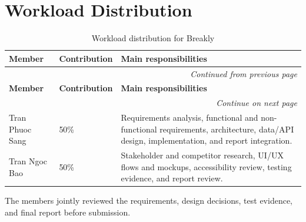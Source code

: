 \chapter*{Workload Distribution}

\begin{longtable}{|p{}|p{}|p{}|}
\caption{Workload distribution for Breakly}\label{tab:workload}\\
\hline
\textbf{Member} & \textbf{Contribution} & \textbf{Main responsibilities} \\
\hline
\endfirsthead
\multicolumn{3}{r}{\textit{Continued from previous page}}\\[-2pt]\hline
\textbf{Member} & \textbf{Contribution} & \textbf{Main responsibilities} \\
\hline
\endhead
\multicolumn{3}{r}{\textit{Continue on next page}}\\
\endfoot
\endlastfoot
Tran Phuoc Sang & 50\% &
Requirements analysis, functional and non-functional requirements,
architecture, data/API design, implementation, and report integration. \\
\hline
Tran Ngoc Bao & 50\% &
Stakeholder and competitor research, UI/UX flows and mockups,
accessibility review, testing evidence, and report review. \\
\hline
\end{longtable}

The members jointly reviewed the requirements, design decisions, test
evidence, and final report before submission.
